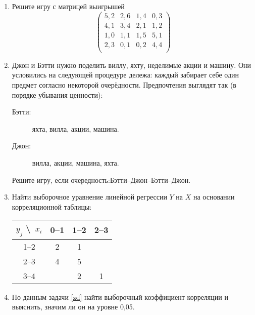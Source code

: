 \documentclass[a4paper,14pt]{extarticle}
\begin{document}
\begin{enumerate}
    \item Решите игру с матрицей выигрышей
    $$\begin{pmatrix}
        5, 2 & 2, 6 & 1, 4 & 0, 3 \\
        4, 1 & 3, 4 & 2, 1 & 1, 2 \\
        1, 0 & 1, 1 & 1, 5 & 5, 1 \\
        2, 3 & 0, 1 & 0, 2 & 4, 4 \\
    \end{pmatrix}
    $$

    \item
    Джон и Бэтти нужно поделить виллу, яхту, неделимые акции и машину. Они условились на следующей процедуре дележа: каждый забирает себе один предмет согласно некоторой очерёдности. 
    Предпочтения выглядят так (в порядке убывания ценности):
    \begin{description}
        \item[Бэтти:] яхта, вилла, акции, машина. 
        \item[Джон:] вилла, акции, машина, яхта.
    \end{description}
    Решите игру, если очередность:Бэтти--Джон--Бэтти--Джон.

    \item Найти выборочное уравнение линейной регрессии $Y$ на $X$ на основании корреляционной таблицы:
    \label{zd}
    
    {\centering
    \begin{tabular}{c|ccc}
        $y_j$ \textbackslash\ $x_i$& 0--1 & 1--2 & 2--3 \\
    \hline
        1--2  & 2    & 1    &      \\
        2--3  & 4    & 5    &      \\
        3--4  &      & 2    & 1    \\
    \end{tabular}\par}

    \item По данным задачи \ref{zd} найти выборочный коэффициент корреляции и выяснить, значим ли он на уровне 0,05.    
\end{enumerate}
    
    

    
    
    
    
    
    
    
    
    
    
    
    
    
    
    
\end{document}
